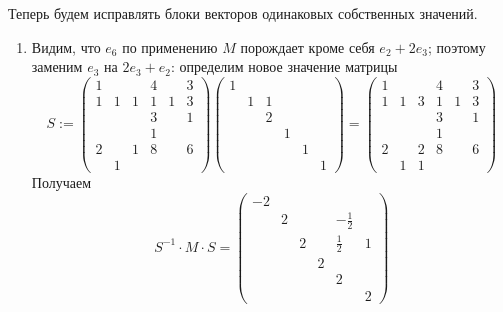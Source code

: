 \documentclass[12pt,a4paper]{article}
\begin{document}
\begin{problem*}
        Теперь будем исправлять блоки векторов одинаковых собственных значений.
        \begin{enumerate}
            \item Видим, что $e_6$ по применению $M$ порождает кроме себя $e_2 + 2e_3$; поэтому заменим $e_3$ на $2e_3 + e_2$: определим новое значение матрицы
                \[
                    S :=
                    \begin{pmatrix}
                        1&&& 4&& 3\\
                        1& 1& 1& 1& 1& 3\\
                        &&& 3&& 1\\
                        &&& 1&&\\
                        2&& 1& 8&& 6\\
                        & 1&&&&
                    \end{pmatrix}
                    \begin{pmatrix}
                        1&&&&&\\
                        &1&1&&&\\
                        &&2&&&\\
                        &&&1&&\\
                        &&&&1&\\
                        &&&&&1
                    \end{pmatrix}
                    =
                    \begin{pmatrix}
                        1&&& 4&& 3\\
                        1& 1& 3& 1& 1& 3\\
                        &&& 3&& 1\\
                        &&& 1&&\\
                        2&&2& 8&& 6\\
                        &1&1&&&
                    \end{pmatrix}
                \]
                Получаем
                \[
                    S^{-1} \cdot M \cdot S =
                    \begin{pmatrix}
                        -2&&&&&\\
                        &2&&&-\frac{1}{2}&\\
                        &&2&&\frac{1}{2}&1\\
                        &&&2&&\\
                        &&&&2&\\
                        &&&&&2 
                    \end{pmatrix}
                \]


\end{enumerate}
\end{problem*}
\end{document}
